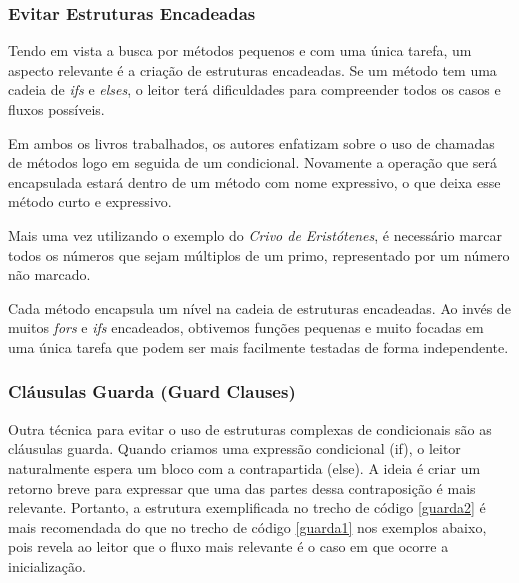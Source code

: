 

\subsubsection{Evitar Estruturas Encadeadas}
Tendo em vista a busca por métodos pequenos e com uma única tarefa, um aspecto relevante é a criação de estruturas encadeadas. Se um método tem uma cadeia de \textit{ifs} e \textit{elses}, o leitor terá dificuldades para compreender todos os casos e fluxos possíveis.
	
Em ambos os livros trabalhados, os autores enfatizam sobre o uso de chamadas de métodos logo em seguida de um condicional. Novamente a operação que será encapsulada estará dentro de um método com nome expressivo, o que deixa esse método curto e expressivo.
	
Mais uma vez utilizando o exemplo do \textit{Crivo de Eristótenes}, é necessário marcar todos os números que sejam múltiplos de um primo, representado por um número não marcado.



Cada método encapsula um nível na cadeia de estruturas encadeadas. Ao invés de muitos \textit{fors} e \textit{ifs} encadeados, obtivemos funções pequenas e muito focadas em uma única tarefa que podem ser mais facilmente testadas de forma independente.

\subsubsection{Cláusulas Guarda (Guard Clauses)}
Outra técnica para evitar o uso de estruturas complexas de condicionais são as cláusulas guarda. Quando criamos uma expressão condicional (if), o leitor naturalmente espera um bloco com a contrapartida (else). A ideia é criar um retorno breve para expressar que uma das partes dessa contraposição é mais relevante. Portanto, a estrutura exemplificada no trecho de código \ref{guarda2} é mais recomendada do que no trecho de código \ref{guarda1} nos exemplos abaixo, pois revela ao leitor que o fluxo mais relevante é o caso em que ocorre a inicialização.




